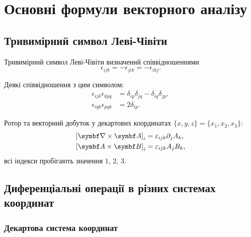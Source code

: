 
\section{Основні формули векторного аналізу}\label{Vanaliz}

\subsection{Тривимірний символ Леві-Чівіти}\label{Levi-Chiv}

Тривимірний символ Леві-Чівіти визначений співвідношеннями 
\begin{equation}\label{eq:Levi-Chiv}
\epsilon_{ijk} =  - \epsilon_{jik} =  - \epsilon_{ikj}.
\end{equation}

Деякі співвідношення з цим символом: 
\begin{align}
    \epsilon_{ijk}\epsilon_{kpq} &= \delta_{ip}\delta_{jq} - \delta_{iq}\delta_{jp}, \\
    \epsilon_{iqk}\epsilon_{pqk} &= 2\delta _{ip}.
\end{align}

Ротор та векторний добуток у декартових координатах $\{x,y,z\} = \{x_1, x_2, x_3\}$:
\begin{align}
\left[\rot\vect{A} \right]_i &= \epsilon_{ijk}{\partial_j}{A_k}, \\
\left[ \vect{A} \times \vect{B} \right]_i &= \epsilon_{ijk}{A_j}{B_k},
\end{align}
всі індекси пробігають значення $1$, $2$, $3$.

\subsection{Диференціальні операції в різних системах координат}

\subsubsection{Декартова система координат}

